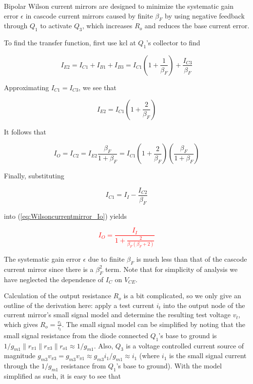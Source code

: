 Bipolar Wilson current mirrors are designed to minimize the systematic gain error $\epsilon$ in cascode current mirrors caused by finite $\beta_{F}$ by using negative feedback through $Q_1$ to activate $Q_3$, which increases $R_{o}$ and reduces the base current error.

To find the transfer function, first use \ac{kcl} at $Q_1$'s collector to find

\begin{equation}
I_{E2} = I_{C1} + I_{B1} + I_{B3} = I_{C1}\left(1+\frac{1}{\beta_{F}}\right) + \frac{I_{C3}}{\beta_{F}}
\end{equation}

Approximating $I_{C1} = I_{C3}$, we see that

\begin{equation}
I_{E2} = I_{C1}\left(1+\frac{2}{\beta_{F}}\right)
\end{equation}

It follows that

\begin{equation}
I_{O} = I_{C2} = I_{E2}\frac{\beta_{F}}{1+\beta_{F}} = I_{C1}\left(1+\frac{2}{\beta_{F}}\right)\left(\frac{\beta_{F}}{1+\beta_{F}}\right)
\label{eq:Wilsoncurrentmirror_Io}
\end{equation}

Finally, substituting

\begin{equation}
I_{C1} = I_{I} - \frac{I_{C2}}{\beta_{F}}
\end{equation}

into (\ref{eq:Wilsoncurrentmirror_Io}) yields

\textcolor{red}{
\begin{equation}
I_{O} = \frac{I_{I}}{1+\frac{2}{\beta_{F} (\beta_{F} + 2)}}
\end{equation}
}

The systematic gain error $\epsilon$ due to finite $\beta_{F}$ is much less than that of the cascode current mirror since there is a $\beta_{F}^{2}$ term.
Note that for simplicity of analysis we have neglected the dependence of $I_{C}$ on $V_{CE}$.

Calculation of the output resistance $R_{o}$ is a bit complicated, so we only give an outline of the derivation here:
apply a test current $i_{t}$ into the output node of the current mirror's small signal model and determine the resulting test voltage $v_{t}$, which gives $R_{o} = \frac{v_{t}}{i_{t}}$.
The small signal model can be simplified by noting that the small signal resistance from the diode connected $Q_{1}$'s base to ground is $1/g_{m1} \parallel r_{\pi1} \parallel r_{\pi3} \parallel r_{o1} \approx 1/g_{m1}$.
Also, $Q_3$ is a voltage controlled current source of magnitude $g_{m3}v_{\pi3} = g_{m3}v_{\pi1} \approx g_{m3}i_{1}/g_{m1} \approx i_{1}$ (where $i_{1}$ is the small signal current through the $1/g_{m1}$ resistance from $Q_1$'s base to ground).
With the model simplified as such, it is easy to see that

